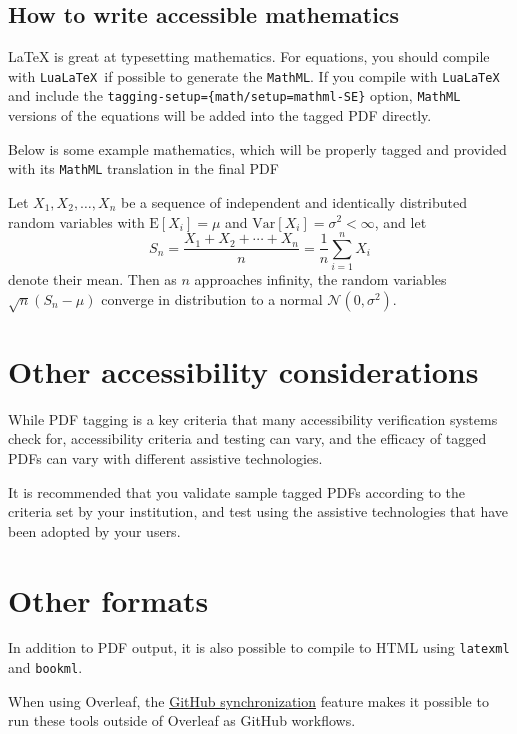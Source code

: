 \documentclass[12pt]{article}
\begin{document}
\subsection{How to write accessible mathematics}

\LaTeX{} is great at typesetting mathematics. 
For equations, you should compile with \texttt{LuaLaTeX }if possible to generate the \texttt{MathML}. If you compile with \texttt{LuaLaTeX} and include the \verb|tagging-setup={math/setup=mathml-SE}| option, \texttt{MathML} versions of the equations will be added into the tagged PDF directly.

Below is some example mathematics, which will be properly tagged and provided with its \texttt{MathML} translation in the final PDF

Let $X_1, X_2, \ldots, X_n$ be a sequence of independent and identically distributed random variables with $\text{E}[X_i] = \mu$ and $\text{Var}[X_i] = \sigma^2 < \infty$, and let
\[S_n = \frac{X_1 + X_2 + \cdots + X_n}{n}
      = \frac{1}{n}\sum_{i=1}^{n} X_i\]
denote their mean. Then as $n$ approaches infinity, the random variables $\sqrt{n}(S_n - \mu)$ converge in distribution to a normal $\mathcal{N}(0, \sigma^2)$.

\section{Other accessibility considerations}
While PDF tagging is a key criteria that many accessibility verification systems check for, accessibility criteria and testing can vary, and the efficacy of tagged PDFs can vary with different assistive technologies. 

It is recommended that you validate sample tagged PDFs according to the criteria set by your institution, and test using the assistive technologies that have been adopted by your users.

\section{Other formats}
In addition to PDF output, it is also possible to compile to HTML using \texttt{latexml} and \texttt{bookml}.

When using Overleaf, the \href{https://docs.overleaf.com/integrations-and-add-ons/git-integration-and-github-synchronization/github-synchronization}{GitHub synchronization} feature makes it possible to run these tools outside of Overleaf as GitHub workflows.

\nocite{*}


\end{document}
